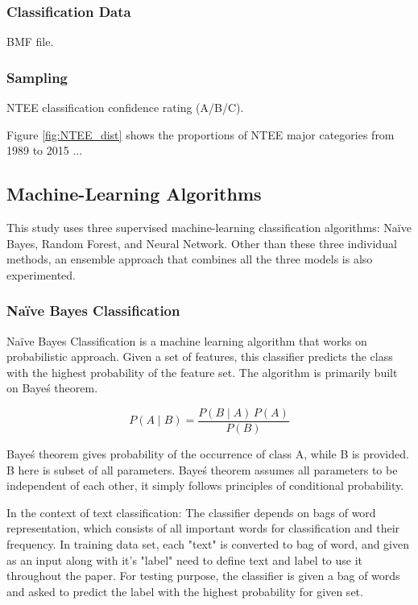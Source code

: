 \documentclass[12pt]{article}
\begin{document}
\subsubsection{Classification Data}
BMF file. 

\subsubsection{Sampling}
NTEE classification confidence rating (A/B/C).


Figure \ref{fig:NTEE_dist} shows the proportions of NTEE major categories from 1989 to 2015 ... 

\subsection{Machine-Learning Algorithms}

This study uses three supervised machine-learning classification algorithms: Na\"ive Bayes, Random Forest, and Neural Network. Other than these three individual methods, an ensemble approach that combines all the three models is also experimented. 

\subsubsection{Na\"ive Bayes Classification}

Na\"ive Bayes Classification is a machine learning algorithm that works on probabilistic approach. Given a set of features, this classifier predicts the class with the highest probability of the feature set. The algorithm is primarily built on Baye\'s theorem.

$$ P(A \mid B) = \frac{P(B \mid A) \, P(A)}{P(B)} $$

Baye\'s theorem gives probability of the occurrence of class A, while B is provided. B here is subset of all parameters. Baye\'s theorem assumes all parameters to be independent of each other, it simply follows principles of conditional probability.

In the context of text classification: The classifier depends on bags of word representation, which consists of all important words for classification and their frequency. In training data set, each "text" is converted to bag of word, and given as an input along with it's "label" {need to define text and label to use it throughout the paper}. For testing purpose, the classifier is given a bag of words and asked to predict the label with the highest probability for given set.
\end{document}

